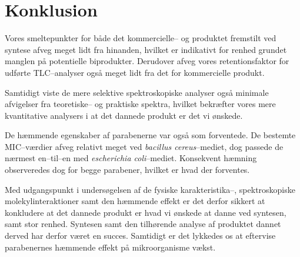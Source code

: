 \section{Konklusion}
Vores smeltepunkter for både det kommercielle-- og produktet fremstilt ved syntese afveg meget lidt fra hinanden, hvilket er indikativt for renhed grundet manglen på potentielle biprodukter. Derudover afveg vores retentionsfaktor for udførte TLC--analyser også meget lidt fra det for kommercielle produkt. 

Samtidigt viste de mere selektive spektroskopiske analyser også minimale afvigelser fra teoretiske-- og praktiske spektra, hvilket bekræfter vores mere kvantitative analysers i at det dannede produkt er det vi ønskede.

De hæmmende egenskaber af parabenerne var også som forventede. De bestemte MIC--værdier afveg relativt meget ved \textit{bacillus cereus}--mediet, dog passede de nærmest en--til--en med \textit{escherichia coli}--mediet. Konsekvent hæmning observeredes dog for begge parabener, hvilket er hvad der forventes.

Med udgangspunkt i undersøgelsen af de fysiske karakteristika--, spektroskopiske molekylinteraktioner samt den hæmmende effekt er det derfor sikkert at konkludere at det dannede produkt er hvad vi ønskede at danne ved syntesen, samt stor renhed. Syntesen samt den tilhørende analyse af produktet dannet derved har derfor været en succes. Samtidigt er det lykkedes os at eftervise parabenernes hæmmende effekt på mikroorganisme vækst.
